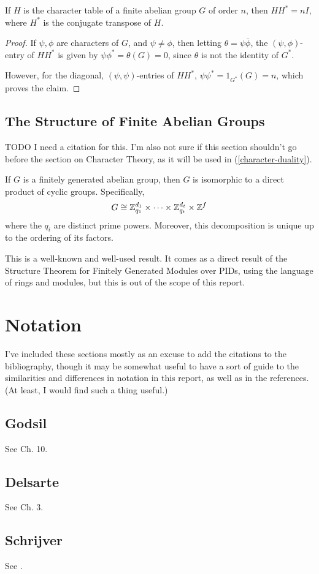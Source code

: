 \documentclass{report}
\begin{document}
    \begin{cor}\label{character-table-unitary}
      If $H$ is the character table of a finite abelian group $G$ of order $n$,
      then $H H^* = nI$, where $H^*$ is the conjugate transpose of $H$.
    \end{cor}

    \begin{proof}
      If $\psi, \phi$ are characters of $G$, and $\psi \neq \phi$,
      then letting $\theta = \psi \bar{\phi}$, the $(\psi, \phi)$-entry of $HH^*$
      is given by $\psi \phi^* = \theta(G) = 0$, since $\theta$ is not the
      identity of $G^*$.

      However, for the diagonal, $(\psi, \psi)$-entries of $HH^*$,
      $\psi \psi^* = 1_{G^*}(G) = n$, which proves the claim.
    \end{proof}

  \section{The Structure of Finite Abelian Groups}
    TODO I need a citation for this.
    I'm also not sure if this section shouldn't go before the section on
    Character Theory, as it will be used in (\ref{character-duality}).

    \begin{thm}\label{structure-theorem}
      If $G$ is a finitely generated abelian group,
      then $G$ is isomorphic to a direct product of cyclic groups.
      Specifically,
      $$
        G \cong
        \mathbb{Z}_{q_1}^{d_1} \times \cdots \times \mathbb{Z}_{q_t}^{d_t}
        \times \mathbb{Z}^f
      $$
      where the $q_i$ are distinct prime powers.
      Moreover, this decomposition is unique up to the ordering of its factors.
    \end{thm}

    This is a well-known and well-used result.  It comes as a direct result of
    the Structure Theorem for Finitely Generated Modules over PIDs, using the
    language of rings and modules, but this is out of the scope of this report.

\chapter{Notation}
  I've included these sections mostly as an excuse to add the citations to the
  bibliography, though it may be somewhat useful to have a sort of guide to the
  similarities and differences in notation in this report, as well as in the
  references.  (At least, I would find such a thing useful.)

  \section{Godsil}
    See \cite{godsil} Ch. 10.

  \section{Delsarte}
    See \cite{delsarte} Ch. 3.

  \section{Schrijver}
    See \cite{schrijver}.

\printbibliography[heading=bibintoc]
\end{document}
